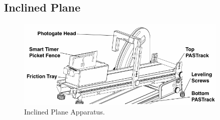\subsection{Inclined Plane}
\begin{figure}[h]
    \begin{center}
        \includegraphics[width=0.9\textwidth]{./Exp3/pic/apparatus.png}
    \end{center}
    \caption{Inclined Plane Apparatus.}
    \label{fig:apparatusplane}
\end{figure}

